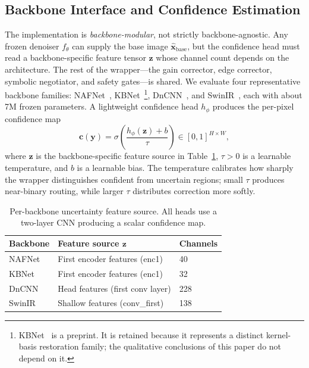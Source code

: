 \documentclass{ieeetj}
\begin{document}
\subsection{Backbone Interface and Confidence Estimation}
\label{sec:backbone_uncertainty}
The implementation is \emph{backbone-modular}, not strictly backbone-agnostic. Any frozen denoiser $f_\theta$ can supply the base image $\hat{\mathbf{x}}_\text{base}$, but the confidence head must read a backbone-specific feature tensor $\mathbf{z}$ whose channel count depends on the architecture. The rest of the wrapper---the gain corrector, edge corrector, symbolic negotiator, and safety gates---is shared. We evaluate four representative backbone families: NAFNet~\cite{chen2022simple}, KBNet~\cite{zhang2023kbnet}\footnote{KBNet~\cite{zhang2023kbnet} is a preprint. It is retained because it represents a distinct kernel-basis restoration family; the qualitative conclusions of this paper do not depend on it.}, DnCNN~\cite{zhang2017beyond}, and SwinIR~\cite{liang2021swinir}, each with about 7M frozen parameters. A lightweight confidence head $h_\phi$ produces the per-pixel confidence map
\begin{equation}
\mathbf{c}(\mathbf{y}) = \sigma\!\left(\frac{h_\phi(\mathbf{z}) + b}{\tau}\right) \in [0,1]^{H \times W},
\label{eq:confidence}
\end{equation}
where $\mathbf{z}$ is the backbone-specific feature source in Table~\ref{tab:uncertainty_sources}, $\tau>0$ is a learnable temperature, and $b$ is a learnable bias. The temperature calibrates how sharply the wrapper distinguishes confident from uncertain regions; small $\tau$ produces near-binary routing, while larger $\tau$ distributes correction more softly.

\begin{table}[t]
\centering
\caption{Per-backbone uncertainty feature source. All heads use a two-layer CNN producing a scalar confidence map.}
\label{tab:uncertainty_sources}
\setlength{\tabcolsep}{4pt}
\begin{tabular}{lll}
\toprule
Backbone & Feature source $\mathbf{z}$ & Channels \\
\midrule
NAFNet & First encoder features (enc1) & 40 \\
KBNet & First encoder features (enc1) & 32 \\
DnCNN & Head features (first conv layer) & 228 \\
SwinIR & Shallow features (conv\_first) & 138 \\
\bottomrule
\end{tabular}
\end{table}
\end{document}

